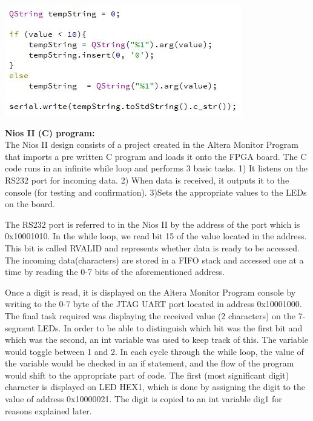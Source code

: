 \documentclass{article}
\newenvironment{Figure}
  {\par\medskip\noindent\ignorespaces\minipage{\linewidth}}
  {\endminipage\par\medskip}
\begin{document}
\begin{multicols*}{2}
\vspace{20 pt}

\begin{Figure}
 \centering
 \includegraphics[width=\linewidth]{integertoconstcharsend.JPG}
\end{Figure}

\vspace{20 pt}

{\bf Nios II (C) program:} \\
The Nios II design consists of a project created in the Altera Monitor Program that imports a pre written C program and loads it onto the FPGA board. The C code runs in an infinite while loop and performs 3 basic tasks. 1) It listens on the RS232 port for incoming data. 2) When data is received, it outputs it to the console (for testing and confirmation). 3)Sets the appropriate values to the LEDs on the board.

	The RS232 port is referred to in the Nios II by the address of the port which is 0x10001010. In the while loop, we read bit 15 of the value located in the address. This bit is called RVALID and represents whether data is ready to be accessed.  The incoming data(characters) are stored in a FIFO stack and accessed one at a time by reading the 0-7 bits of the aforementioned address.

	Once a digit is read, it is displayed on the Altera Monitor Program console by writing to the 0-7 byte of the JTAG UART port located in address 0x10001000.
	The final task required was displaying the received value (2 characters) on the 7-segment LEDs. In order to be able to distinguish which bit was the first bit and which was the second, an int variable was used to keep track of this. The variable would toggle between 1 and 2. In each cycle through the while loop, the value of the variable would be checked in an if statement, and the flow of the program would shift to the appropriate part of code. The first (most significant digit) character is displayed on LED HEX1, which is done by assigning the digit to the value of   address 0x10000021. The digit is copied to an int variable dig1 for reasons explained later.


\end{multicols*}
\end{document}
